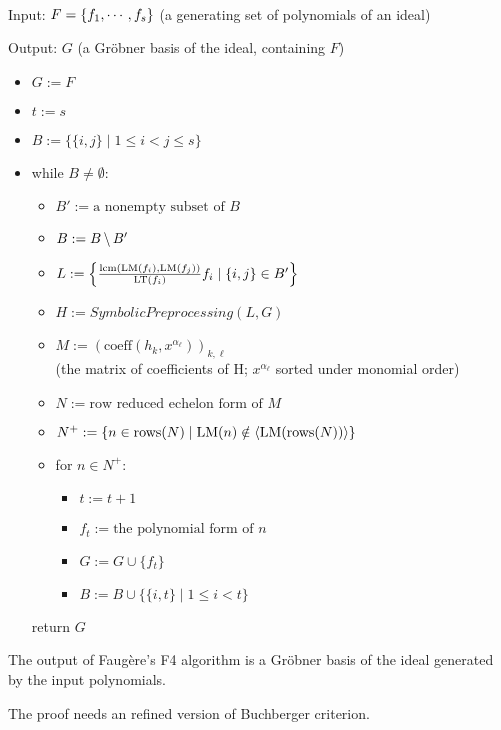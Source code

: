 
\begin{definition}
    \label{def:FaugereF4}
    ~\\
    
    Input: \(F = \{ f_1, \cdots, f_s \}\)
    (a generating set of polynomials of an ideal)

    Output: \(G\) (a Gr\"obner basis of the ideal, containing \(F\))

    \begin{itemize}
        \item \(G := F\)
        \item \(t := s\)
        \item \(B := \{\{i, j\} \mid 1 \le i < j \le s\}\)
        \item while \(B \ne \emptyset\):
            \begin{itemize}
                \item \(B' := \textrm{a nonempty subset of } B\)
                \item \(B := B \,\backslash\, B'\)
                \item \(L := \left\{\frac{\mathrm{lcm}(\mathrm{LM}(f_i), \mathrm{LM}(f_j))}{\mathrm{LT}(f_i)} f_i \mid \{i, j\} \in B' \right\}\)
                \item \(H := SymbolicPreprocessing(L, G)\)
                \item \(M := (\mathrm{coeff}(h_k, x^{\alpha_\ell}))_{k, \ell}\)\\
                (the matrix of coefficients of H; \(x^{\alpha_\ell}\) sorted under monomial order)
                \item \(N := \textrm{row reduced echelon form of } M\)
                \item \(N^+ := \{n \in \mathrm{rows}(N) \mid \mathrm{LM}(n) \notin \left< \mathrm{LM}(\mathrm{rows}(N)) \right>\}\)
                \item for \(n \in N^+\):
                    \begin{itemize}
                        \item \(t := t + 1\)
                        \item \(f_t := \textrm{the polynomial form of } n\)
                        \item \(G := G \cup \{f_t\}\)
                        \item \(B := B \cup \{\{i, t\} \mid 1 \le i < t\}\)
                    \end{itemize}
            \end{itemize}
        return \(G\)
    \end{itemize}
\end{definition}

\begin{theorem}[Result of F4]
    \label{def:FaugereF4Result}
    The output of Faug\`ere's F4 algorithm is a Gr\"obner basis of the ideal
    generated by the input polynomials.
\end{theorem}
The proof needs an refined version of Buchberger criterion.